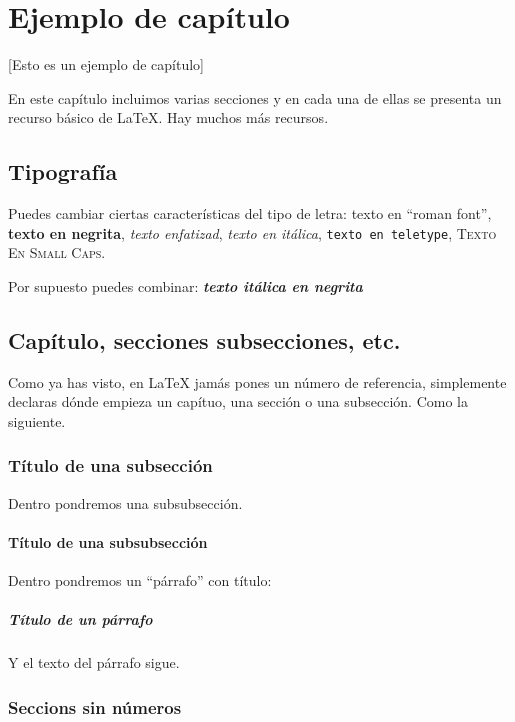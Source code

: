 \chapter{Ejemplo de capítulo}
[Esto es un ejemplo de capítulo]

En este capítulo incluimos varias secciones y en cada una de ellas se presenta un recurso básico de LaTeX. Hay muchos más recursos.

\section{Tipografía}

Puedes cambiar ciertas características del tipo de letra: \textrm{texto en ``roman font''}, \textbf{texto en negrita}, \emph{texto enfatizad}, \textit{texto en itálica}, \texttt{texto en teletype}, \textsc{Texto En Small Caps}.

Por supuesto puedes combinar: \textbf{\textit{texto itálica en negrita}}

\section{Capítulo, secciones subsecciones, etc.}

Como ya has visto, en LaTeX jamás pones un número de referencia, simplemente declaras dónde empieza un capítuo, una sección o una subsección. Como la siguiente.

\subsection{Título de una subsección}

Dentro pondremos una subsubsección.

\subsubsection{Título de una subsubsección}

Dentro pondremos un ``párrafo'' con título:

\paragraph{Título de un párrafo}
Y el texto del párrafo sigue.

\subsection{Seccions sin números}

